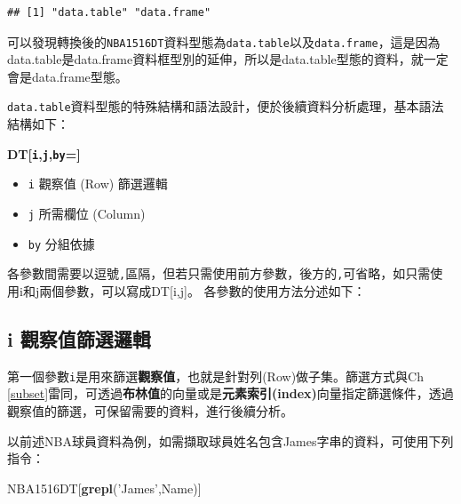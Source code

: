 \documentclass[]{book}
\newenvironment{Shaded}{\begin{snugshade}}{\end{snugshade}}
\newcommand{\KeywordTok}[1]{\textcolor[rgb]{0.13,0.29,0.53}{\textbf{{#1}}}}
\newcommand{\StringTok}[1]{\textcolor[rgb]{0.31,0.60,0.02}{{#1}}}
\newcommand{\NormalTok}[1]{{#1}}
\providecommand{\tightlist}{%
  \setlength{\itemsep}{0pt}\setlength{\parskip}{0pt}}
\theoremstyle{definition}
\theoremstyle{definition}
\theoremstyle{remark}
\begin{document}
\begin{verbatim}
## [1] "data.table" "data.frame"
\end{verbatim}

可以發現轉換後的\texttt{NBA1516DT}資料型態為\texttt{data.table}以及\texttt{data.frame}，這是因為data.table是data.frame資料框型別的延伸，所以是data.table型態的資料，就一定會是data.frame型態。

\texttt{data.table}資料型態的特殊結構和語法設計，便於後續資料分析處理，基本語法結構如下：

\textbf{DT{[}\textbf{\texttt{i}},\textbf{\texttt{j}},\textbf{\texttt{by}}={]}}

\begin{itemize}
\tightlist
\item
  \texttt{i} 觀察值 (Row) 篩選邏輯
\item
  \texttt{j} 所需欄位 (Column)
\item
  \texttt{by} 分組依據
\end{itemize}

各參數間需要以逗號\texttt{,}區隔，但若只需使用前方參數，後方的\texttt{,}可省略，如只需使用i和j兩個參數，可以寫成DT{[}i,j{]}。
各參數的使用方法分述如下：

\subsection{i 觀察值篩選邏輯}\label{i-}

第一個參數\texttt{i}是用來篩選\textbf{觀察值}，也就是針對列(Row)做子集。篩選方式與Ch
\ref{subset}雷同，可透過\textbf{布林值}的向量或是\textbf{元素索引(index)}向量指定篩選條件，透過觀察值的篩選，可保留需要的資料，進行後續分析。

以前述NBA球員資料為例，如需擷取球員姓名包含James字串的資料，可使用下列指令：

\begin{Shaded}
\begin{Highlighting}[]
\NormalTok{NBA1516DT[}\KeywordTok{grepl}\NormalTok{(}\StringTok{'James'}\NormalTok{,Name)]}
\end{Highlighting}
\end{Shaded}
\end{document}

